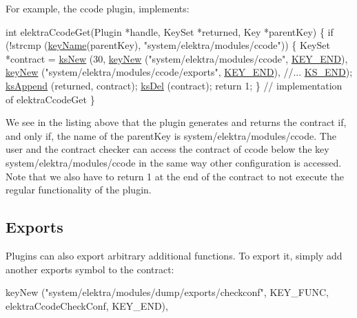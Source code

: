 For example, the ccode plugin, implements\+:


\begin{DoxyCode}
\textcolor{keywordtype}{int} elektraCcodeGet(Plugin *handle, KeySet *returned, Key *parentKey)
\{
        \textcolor{keywordflow}{if} (!strcmp (\hyperlink{group__keyname_ga8e805c726a60da921d3736cda7813513}{keyName}(parentKey), \textcolor{stringliteral}{"system/elektra/modules/ccode"}))
        \{
                KeySet *contract = \hyperlink{group__keyset_ga671e1aaee3ae9dc13b4834a4ddbd2c3c}{ksNew} (30,
                        \hyperlink{group__key_gad23c65b44bf48d773759e1f9a4d43b89}{keyNew} (\textcolor{stringliteral}{"system/elektra/modules/ccode"},
                                \hyperlink{group__key_gga91fb3178848bd682000958089abbaf40aa8adb6fcb92dec58fb19410eacfdd403}{KEY\_END}),
                        \hyperlink{group__key_gad23c65b44bf48d773759e1f9a4d43b89}{keyNew} (\textcolor{stringliteral}{"system/elektra/modules/ccode/exports"},
                                \hyperlink{group__key_gga91fb3178848bd682000958089abbaf40aa8adb6fcb92dec58fb19410eacfdd403}{KEY\_END}),
                        \textcolor{comment}{//...}
                        \hyperlink{kdbenum_8c_a7a28fce3773b2c873c94ac80b8b4cd54}{KS\_END});
                \hyperlink{group__keyset_ga21eb9c3a14a604ee3a8bdc779232e7b7}{ksAppend} (returned, contract);
                \hyperlink{group__keyset_ga27e5c16473b02a422238c8d970db7ac8}{ksDel} (contract);
                \textcolor{keywordflow}{return} 1;
        \}
        \textcolor{comment}{// implementation of elektraCcodeGet}
\}
\end{DoxyCode}


We see in the listing above that the plugin generates and returns the contract if, and only if, the name of the {\ttfamily parent\+Key} is {\ttfamily system/elektra/modules/ccode}. The user and the contract checker can access the contract of ccode below the key {\ttfamily system/elektra/modules/ccode} in the same way other configuration is accessed. Note that we also have to {\ttfamily return 1} at the end of the contract to not execute the regular functionality of the plugin.

\subsection*{Exports}

Plugins can also export arbitrary additional functions. To export it, simply add another {\ttfamily exports} symbol to the contract\+: \begin{DoxyVerb}    keyNew ("system/elektra/modules/dump/exports/checkconf", KEY_FUNC,
            elektraCcodeCheckConf, KEY_END),
\end{DoxyVerb}


